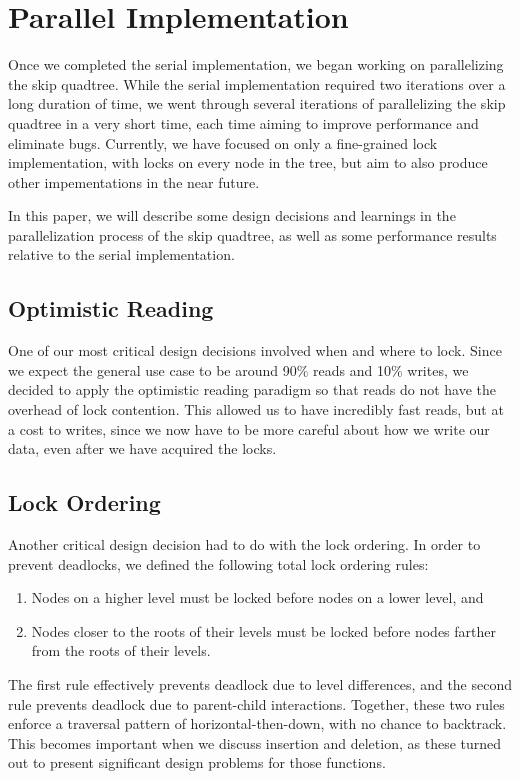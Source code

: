 \documentclass[10pt]{article}
\begin{document}
\section{Parallel Implementation}
Once we completed the serial implementation, we began working on parallelizing the skip quadtree. While the serial implementation required two iterations over a long duration of time, we went through several iterations of parallelizing the skip quadtree in a very short time, each time aiming to improve performance and eliminate bugs. Currently, we have focused on only a fine-grained lock implementation, with locks on every node in the tree, but aim to also produce other impementations in the near future.

In this paper, we will describe some design decisions and learnings in the parallelization process of the skip quadtree, as well as some performance results relative to the serial implementation.

\subsection{Optimistic Reading}
One of our most critical design decisions involved when and where to lock. Since we expect the general use case to be around 90\% reads and 10\% writes, we decided to apply the optimistic reading paradigm so that reads do not have the overhead of lock contention. This allowed us to have incredibly fast reads, but at a cost to writes, since we now have to be more careful about how we write our data, even after we have acquired the locks.

\subsection{Lock Ordering}
Another critical design decision had to do with the lock ordering. In order to prevent deadlocks, we defined the following total lock ordering rules:

\begin{enumerate}
\item Nodes on a higher level must be locked before nodes on a lower level, and
\item Nodes closer to the roots of their levels must be locked before nodes farther from the roots of their levels.
\end{enumerate}

The first rule effectively prevents deadlock due to level differences, and the second rule prevents deadlock due to parent-child interactions. Together, these two rules enforce a traversal pattern of horizontal-then-down, with no chance to backtrack. This becomes important when we discuss insertion and deletion, as these turned out to present significant design problems for those functions.
\end{document}
